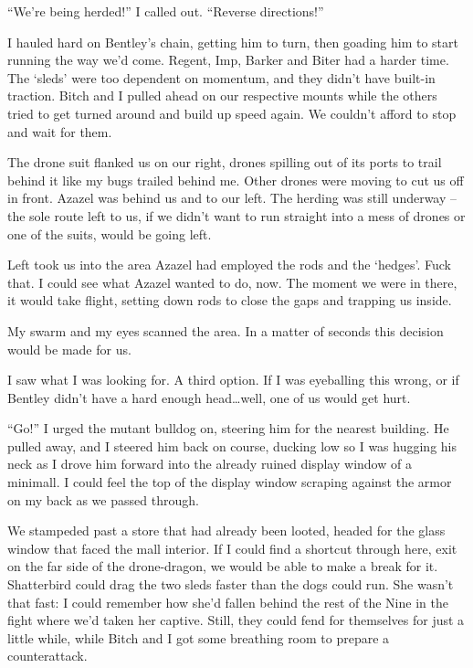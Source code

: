 ``We're being herded!''  I called out.  ``Reverse directions!''



I hauled hard on Bentley's chain, getting him to turn, then goading him to start running the way we'd come.  Regent, Imp, Barker and Biter had a harder time.  The `sleds' were too dependent on momentum, and they didn't have built-in traction.  Bitch and I pulled ahead on our respective mounts while the others tried to get turned around and build up speed again.  We couldn't afford to stop and wait for them.



The drone suit flanked us on our right, drones spilling out of its ports to trail behind it like my bugs trailed behind me.  Other drones were moving to cut us off in front.  Azazel was behind us and to our left.  The herding was still underway – the sole route left to us, if we didn't want to run straight into a mess of drones or one of the suits, would be going left.



Left took us into the area Azazel had employed the rods and the `hedges'.  Fuck that.  I could see what Azazel wanted to do, now.  The moment we were in there, it would take flight, setting down rods to close the gaps and trapping us inside.



My swarm and my eyes scanned the area.  In a matter of seconds this decision would be made for us.



I saw what I was looking for.  A third option.  If I was eyeballing this wrong, or if Bentley didn't have a hard enough head\ldots well, one of us would get hurt.



``Go!'' I urged the mutant bulldog on, steering him for the nearest building.  He pulled away, and I steered him back on course, ducking low so I was hugging his neck as I drove him forward into the already ruined display window of a minimall.  I could feel the top of the display window scraping against the armor on my back as we passed through.



We stampeded past a store that had already been looted, headed for the glass window that faced the mall interior.  If I could find a shortcut through here, exit on the far side of the drone-dragon, we would be able to make a break for it.  Shatterbird could drag the two sleds faster than the dogs could run.  She wasn't that fast: I could remember how she'd fallen behind the rest of the Nine in the fight where we'd taken her captive.  Still, they could fend for themselves for just a little while, while Bitch and I got some breathing room to prepare a counterattack.




